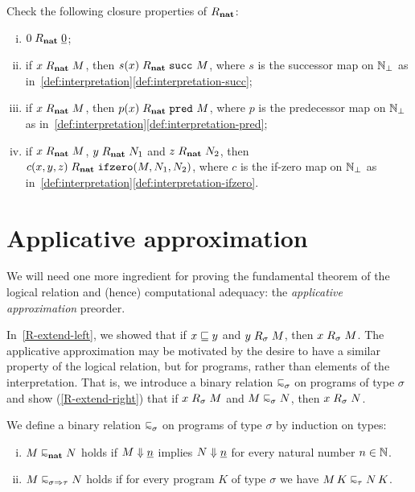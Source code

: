 \begin{exercise}\label{exer:closure-under-basic-operations}
  Check the following closure properties of \(\mathrel{R}_\mathtt{\mathbf{nat}}\):
  \begin{enumerate}[(i)]
  \item \(0 \mathrel{R}_\mathtt{\mathbf{nat}} \underline{0}\);
  \item if \(x \mathrel{R}_\mathtt{\mathbf{nat}} M\), then \(s(x) \mathrel{R}_\mathtt{\mathbf{nat}} \operatorname{\mathtt{succ}}\, M\),
    where \(s\) is the successor map on \(\mathbb N_\bot\) as
    in~\cref{def:interpretation}\ref{def:interpretation-succ};
  \item if \(x \mathrel{R}_\mathtt{\mathbf{nat}} M\), then \(p(x) \mathrel{R}_\mathtt{\mathbf{nat}} \operatorname{\mathtt{pred}}\, M\),
    where \(p\) is the predecessor map on \(\mathbb N_\bot\) as
    in~\cref{def:interpretation}\ref{def:interpretation-pred};
  \item if \(x \mathrel{R}_\mathtt{\mathbf{nat}} M\), \(y \mathrel{R}_\mathtt{\mathbf{nat}} N_1\) and
    \(z \mathrel{R}_\mathtt{\mathbf{nat}} N_2\), then
    \(c(x,y,z) \mathrel{R}_\mathtt{\mathbf{nat}} \operatorname{\mathtt{ifzero}}(M,N_1,N_2)\), where \(c\) is the if-zero
    map on \(\mathbb N_\bot\) as
    in~\cref{def:interpretation}\ref{def:interpretation-ifzero}.
  \end{enumerate}
\end{exercise}

\section{Applicative approximation}

We will need one more ingredient for proving the fundamental theorem of the
logical relation and (hence) computational adequacy: the \emph{applicative
  approximation} preorder.

In~\cref{R-extend-left}, we showed that if \(x \sqsubseteq y\) and
\(y \mathrel{R}_\sigma M\), then \(x \mathrel{R}_\sigma M\).
%
The applicative approximation may be motivated by the desire to have a similar
property of the logical relation, but for programs, rather than elements of the
interpretation. That is, we introduce a binary relation \(\appapprox_\sigma\) on
programs of type \(\sigma\) and show (\cref{R-extend-right}) that if
\(x \mathrel{R}_\sigma M\) and \(M \appapprox_\sigma N\), then
\(x \mathrel{R}_\sigma N\).

\begin{definition}
  We define a binary relation \(\appapprox_\sigma\) on programs of type
  \(\sigma\) by induction on types:
  \begin{enumerate}[(i)]
  \item \(M \appapprox_\pcfnat N\) holds if \(M \Downarrow \underline{n}\) implies
    \(N \Downarrow \underline{n}\) for every natural number \(n\in\mathbb N\).
  \item \(M \appapprox_{\sigma \pcffun \tau} N\) holds if for every program
    \(K\) of type \(\sigma\) we have \(M \, K \appapprox_\tau N \, K\).
  \end{enumerate}
\end{definition}

